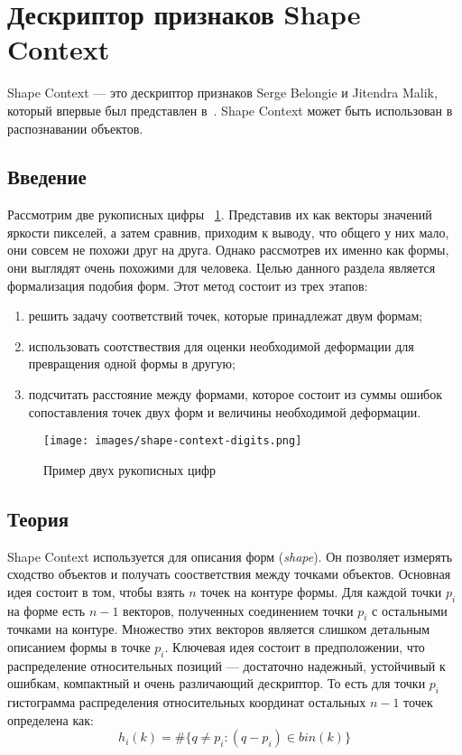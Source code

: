 \section{Дескриптор признаков Shape Context}
Shape Context --- это дескриптор признаков Serge Belongie и Jitendra Malik, который впервые был представлен в~\cite{belongie002}. Shape Context может быть использован в распознавании объектов.

\subsection{Введение}
Рассмотрим две рукописных цифры ~\ref{shape-context-digits}. Представив их как векторы значений яркости пикселей, а затем сравнив, приходим к выводу, что общего у них мало, они совсем не похожи друг на друга. Однако рассмотрев их именно как формы, они выглядят очень похожими для человека. Целью данного раздела является формализация подобия форм. Этот метод состоит из трех этапов:

\begin{enumerate}
  \item решить задачу соответствий точек, которые принадлежат двум формам;
  \item использовать соотствествия для оценки необходимой деформации для превращения одной формы в другую;
  \item подсчитать расстояние между формами, которое состоит из суммы ошибок сопоставления точек двух форм и величины необходимой деформации.
\end{enumerate}

\begin{figure}[h]
  \centering
  \texttt{[image: images/shape-context-digits.png]}
  \caption{Пример двух рукописных цифр\label{shape-context-digits}}
\end{figure}

\subsection{Теория}
Shape Context используется для описания форм (\emph{shape}). Он позволяет измерять сходство объектов и получать соостветствия между точками объектов. Основная идея состоит в том, чтобы взять $n$ точек на контуре формы. Для каждой точки $p_i$ на форме есть $n-1$ векторов, полученных соединением точки $p_i$ с остальными точками на контуре. Множество этих векторов является слишком детальным описанием формы в точке $p_i$. Ключевая идея состоит в предположении, что распределение относительных позиций --- достаточно надежный, устойчивый к ошибкам, компактный и очень различающий дескриптор. То есть для точки $p_i$ гистограмма распределения относительных координат остальных $n-1$ точек определена как:
\begin{displaymath}
  h_i(k) = \#\{q \neq p_i : (q - p_i) \in bin(k)\}
\end{displaymath}

